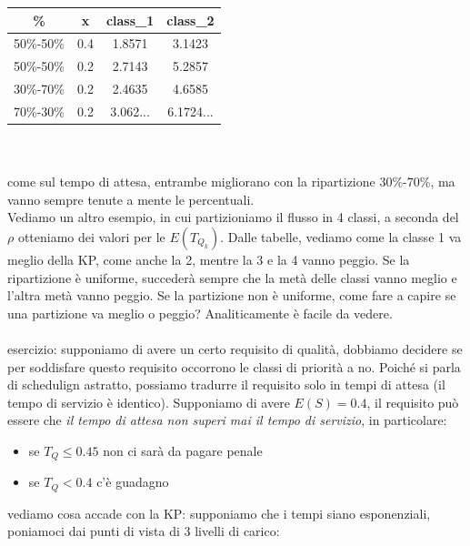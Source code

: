 \documentclass{article}
\begin{document}
\begin{tabular}{ |c|c|c|c|}
\hline
\% & x & class\_1 & class\_2\\
\hline
50\%-50\% & 0.4 & 1.8571 & 3.1423\\
\hline
50\%-50\% & 0.2 & 2.7143 & 5.2857\\
\hline
30\%-70\% & 0.2 & 2.4635 & 4.6585\\
\hline
70\%-30\% & 0.2 & 3.062... & 6.1724...\\
\hline
\end{tabular}\\\\
come sul tempo di attesa, entrambe migliorano con la ripartizione 30\%-70\%, ma vanno sempre tenute a mente le percentuali.
\\ Vediamo un altro esempio, in cui partizioniamo il flusso in 4 classi, a seconda del $\rho$ otteniamo dei valori per le $E(T_{Q_k})$. Dalle tabelle, vediamo come la classe 1 va meglio della KP, come anche la 2, mentre la 3 e la 4 vanno peggio. Se la ripartizione è uniforme, succederà sempre che la metà delle classi vanno meglio e l'altra metà vanno peggio. Se la partizione non è uniforme, come fare a capire se una partizione va meglio o peggio? Analiticamente è facile da vedere.\\\\ esercizio: supponiamo di avere un certo requisito di qualità, dobbiamo decidere se per soddisfare questo requisito occorrono le classi di priorità a no. Poiché si parla di schedulign astratto, possiamo tradurre il requisito solo in tempi di attesa (il tempo di servizio  è identico). Supponiamo di avere $E(S) = 0.4$, il requisito può essere che \textit{il tempo di attesa non superi mai il tempo di servizio}, in particolare:
\begin{itemize}
\item se $T_Q \leq 0.45$ non ci sarà da pagare penale
\item se $T_Q < 0.4$ c'è guadagno
\end{itemize}
vediamo cosa accade con la KP: supponiamo che i tempi siano esponenziali, poniamoci dai punti di vista di 3 livelli di carico:
\end{document}
